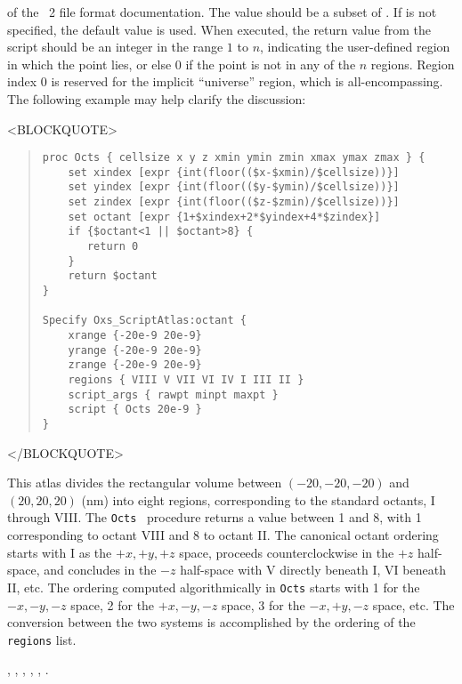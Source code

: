 \begin{description}
 of the
\MIF~2 file format documentation.  The value 
should be a subset of .  If
 is not specified, the default value  is
used.  When executed, the return value from the script should be an
integer in the range $1$ to $n$, indicating the user-defined region in
which the point lies, or else $0$ if the point is not in any
of the $n$ regions.  Region index $0$ is reserved for the implicit
``universe'' region, which is all-encompassing.  The following example
may help clarify the discussion:
\begin{rawhtml}
<BLOCKQUOTE>
\end{rawhtml}
\begin{quote}
\begin{verbatim}
proc Octs { cellsize x y z xmin ymin zmin xmax ymax zmax } {
    set xindex [expr {int(floor(($x-$xmin)/$cellsize))}]
    set yindex [expr {int(floor(($y-$ymin)/$cellsize))}]
    set zindex [expr {int(floor(($z-$zmin)/$cellsize))}]
    set octant [expr {1+$xindex+2*$yindex+4*$zindex}]
    if {$octant<1 || $octant>8} {
       return 0
    }
    return $octant
}

Specify Oxs_ScriptAtlas:octant {
    xrange {-20e-9 20e-9}
    yrange {-20e-9 20e-9}
    zrange {-20e-9 20e-9}
    regions { VIII V VII VI IV I III II }
    script_args { rawpt minpt maxpt }
    script { Octs 20e-9 }
}
\end{verbatim}
\end{quote}
\begin{rawhtml}
</BLOCKQUOTE>
\end{rawhtml}
This atlas divides the rectangular volume between $(-20,-20,-20)$ and
$(20,20,20)$ (nm) into eight regions, corresponding to the standard
octants, I through VIII.  The \texttt{Octs} \Tcl\ procedure returns a
value between 1 and 8, with 1 corresponding to octant VIII and 8 to
octant II.  The canonical octant ordering starts with I as the
$+x,+y,+z$ space, proceeds counterclockwise in the $+z$ half-space, and
concludes in the $-z$ half-space with V directly beneath I, VI beneath
II, etc.  The ordering computed algorithmically in \texttt{Octs}
starts with 1 for the $-x,-y,-z$ space, 2 for the $+x,-y,-z$ space, 3
for the $-x,+y,-z$ space, etc.  The conversion between the two systems
is accomplished by the ordering of the \texttt{regions} list.

\begin{ExampleMifs}
  , , ,
  , , .
\end{ExampleMifs}
\end{description}

